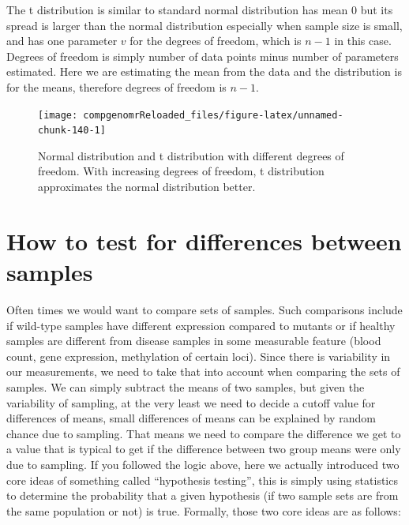 \documentclass[12pt,]{krantz}
\begin{document}
The t distribution is similar to standard normal distribution has mean 0 but its spread is larger than the normal distribution
especially when sample size is small, and has one parameter \(v\) for
the degrees of freedom, which is \(n-1\) in this case. Degrees of freedom
is simply number of data points minus number of parameters estimated. Here
we are estimating the mean from the data and the distribution is for the means, therefore degrees of freedom is \(n-1\).

\begin{figure}

{\centering \texttt{[image: compgenomrReloaded\_files/figure-latex/unnamed-chunk-140-1]} 

}

\caption{Normal distribution and t distribution with different degrees of freedom. With increasing degrees of freedom, t distribution approximates the normal distribution better.}\label{fig:unnamed-chunk-140}
\end{figure}

\hypertarget{how-to-test-for-differences-between-samples}{%
\section{How to test for differences between samples}\label{how-to-test-for-differences-between-samples}}

Often times we would want to compare sets of samples. Such comparisons include
if wild-type samples have different expression compared to mutants or if healthy
samples are different from disease samples in some measurable feature (blood count,
gene expression, methylation of certain loci). Since there is variability in our
measurements, we need to take that into account when comparing the sets of samples.
We can simply subtract the means of two samples, but given the variability
of sampling, at the very least we need to decide a cutoff value for differences
of means, small differences of means can be explained by random chance due to
sampling. That means we need to compare the difference we get to a value that
is typical to get if the difference between two group means were only due to
sampling. If you followed the logic above, here we actually introduced two core
ideas of something called ``hypothesis testing'', this is simply using
statistics to
determine the probability that a given hypothesis (if two sample sets
are from the same population or not) is true. Formally, those two core
ideas are as follows:
\end{document}
